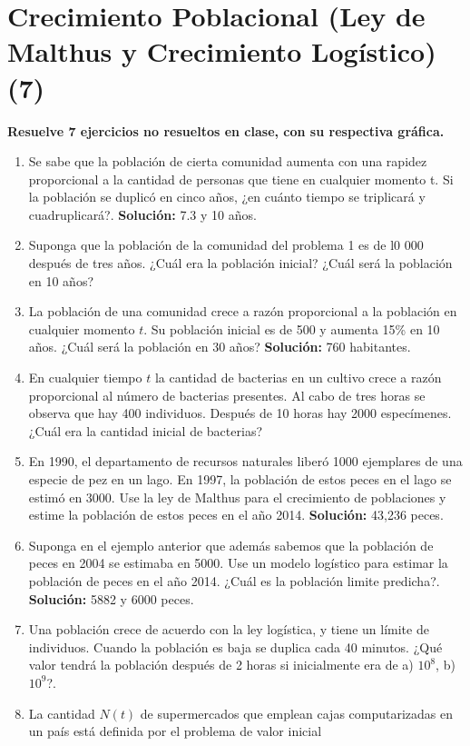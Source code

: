 \documentclass[letterpaper,10pt]{memoir}
\begin{document}
\titulo

\section*{Crecimiento Poblacional (Ley de Malthus y Crecimiento Logístico) (7)} %
\textbf{Resuelve 7 ejercicios no resueltos en clase, con su respectiva gráfica.}
\begin{enumerate}
	\item Se sabe que la población de cierta comunidad aumenta con una rapidez proporcional a la cantidad de personas que tiene en cualquier momento t. Si la población se duplicó en cinco años, ¿en cuánto tiempo se triplicará y cuadruplicará?. \textbf{Solución:} 7.3 y 10 años.
	\item Suponga que la población de la comunidad del problema 1 es de l0 000 después de tres años. ¿Cuál era la población inicial? ¿Cuál será la población en 10 años?
	\item La población de una comunidad crece a razón proporcional a la población en cualquier momento \(t\). Su población inicial es de 500 y aumenta 15\% en 10 años. ¿Cuál será la población en 30 años? \textbf{Solución:} 760 habitantes.
	\item En cualquier tiempo \(t\) la cantidad de bacterias en un cultivo crece a razón proporcional al número de bacterias presentes. Al cabo de tres horas se observa que hay 400 individuos. Después de 10 horas hay 2000 especímenes. ¿Cuál era la cantidad inicial de bacterias?
	\item En 1990, el departamento de recursos naturales liberó 1000 ejemplares de una especie de pez en un lago. En 1997, la población de estos peces en el lago se estimó en 3000. Use la ley de Malthus para el crecimiento de poblaciones y estime la población de estos peces en el año 2014. \textbf{Solución:} 43,236 peces.
	\item Suponga en el ejemplo anterior que además sabemos que la población de peces en 2004 se estimaba en 5000. Use un modelo logístico para estimar la población de peces en el año 2014. ¿Cuál es la población limite predicha?. \textbf{Solución:} 5882 y 6000 peces.
	\item Una población crece de acuerdo con la ley logística, y tiene un límite de individuos. Cuando la población es baja se duplica cada 40 minutos. ¿Qué valor tendrá la población después de 2 horas si inicialmente era de a) \(10^8\), b) \(10^9\)?.
	\item La cantidad \(N(t)\) de supermercados que emplean cajas computarizadas en un país está definida por el problema de valor inicial

\end{enumerate}
\end{document}

